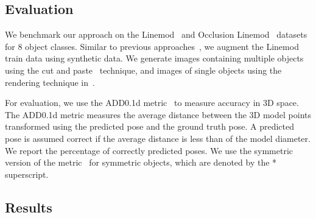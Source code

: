 \documentclass{article}
\begin{document}
\subsection{Evaluation}
We benchmark our approach on the Linemod~\cite{linemod} and Occlusion Linemod~\cite{occlusionlinemod} datasets for 8 object classes. Similar to previous approaches~\cite{peng2019pvnet}\cite{hu2020single}, we augment the Linemod train data using synthetic data. We generate  images containing multiple objects using the cut and paste~\cite{dwibedi2017cut} technique, and  images of single objects using the rendering technique in~\cite{peng2019pvnet}. 

For evaluation, we use the ADD0.1d metric~\cite{linemod} to measure accuracy in 3D space. The ADD0.1d metric measures the average distance between the 3D model points transformed using the predicted pose and the ground truth pose. A predicted pose is assumed correct if the average distance is less than  of the model diameter. We report the percentage of correctly predicted poses. We use the symmetric version of the metric~\cite{xiang2018posecnn} for symmetric objects, which are denoted by the * superscript.






\subsection{Results}
\end{document}
